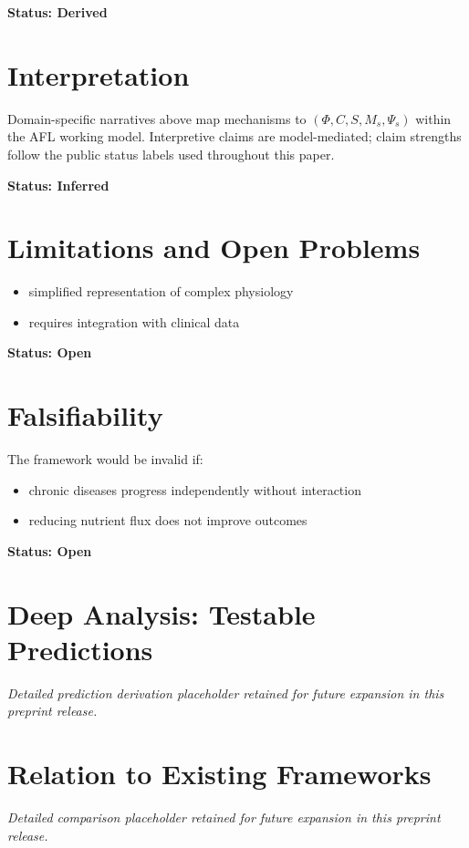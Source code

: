 \documentclass[11pt]{article}
\begin{document}
\textbf{Status: Derived}

\section{Interpretation}
Domain-specific narratives above map mechanisms to $(\Phi, C, S, M_s, \Psi_s)$ within the AFL working model. Interpretive claims are model-mediated; claim strengths follow the public status labels used throughout this paper.

\textbf{Status: Inferred}

\section{Limitations and Open Problems}

\begin{itemize}
    \item simplified representation of complex physiology
    \item requires integration with clinical data
\end{itemize}

\textbf{Status: Open}

\section{Falsifiability}

The framework would be invalid if:

\begin{itemize}
    \item chronic diseases progress independently without interaction
    \item reducing nutrient flux does not improve outcomes
\end{itemize}

\textbf{Status: Open}


\section{Deep Analysis: Testable Predictions}
\noindent\textit{Detailed prediction derivation placeholder retained for future expansion in this preprint release.}

\section{Relation to Existing Frameworks}
\noindent\textit{Detailed comparison placeholder retained for future expansion in this preprint release.}
\end{document}
